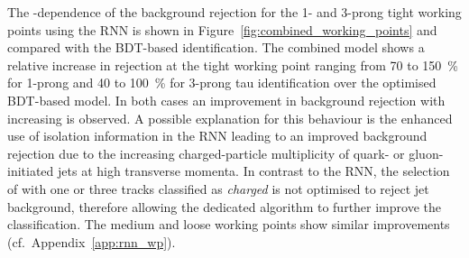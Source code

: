The \pt-dependence of the background rejection for the 1- and 3-prong tight
working points using the RNN is shown in
Figure~\ref{fig:combined_working_points} and compared with the BDT-based
identification. The combined model shows a relative increase in rejection at the
tight working point ranging from \num{70} to \SI{150}{\percent} for 1-prong and
\num{40} to \SI{100}{\percent} for 3-prong tau identification over the optimised
BDT-based model. In both cases an improvement in background rejection with
increasing \tauhadvis \pt is observed. A possible explanation for this behaviour
is the enhanced use of isolation information in the RNN leading to an improved
background rejection due to the increasing charged-particle multiplicity of
quark- or gluon-initiated jets at high transverse momenta. In contrast to the
RNN, the selection of \tauhadvis with one or three tracks classified as
\emph{charged} is not optimised to reject jet background, therefore allowing the
dedicated algorithm to further improve the classification. The medium and loose
working points show similar improvements (cf.\ Appendix~\ref{app:rnn_wp}).

